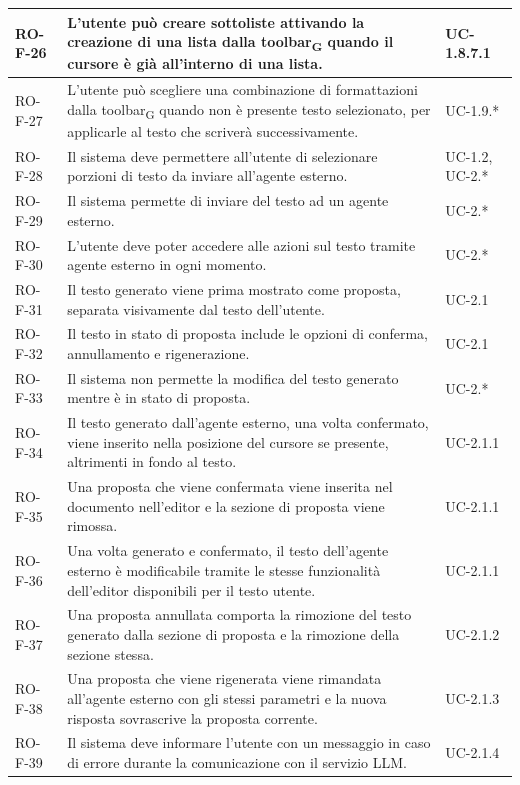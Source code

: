 \documentclass[11pt,a4paper]{article}
\newcommand{\gls}[1]{#1\textsubscript{G}}
\begin{document}
\begin{longtable}{|p{}|>{\raggedright\arraybackslash}p{}|p{}|}
\hline
RO-F-26 & L'utente può creare sottoliste attivando la creazione di una lista dalla \gls{toolbar} quando il cursore è già all'interno di una lista. & UC-1.8.7.1 \\
\hline
RO-F-27 & L'utente può scegliere una combinazione di formattazioni dalla \gls{toolbar} quando non è presente testo selezionato, per applicarle al testo che scriverà successivamente. & UC-1.9.* \\
\hline
RO-F-28 & Il sistema deve permettere all'utente di selezionare porzioni di testo da inviare all'agente esterno. & UC-1.2, UC-2.* \\
\hline
RO-F-29 & Il sistema permette di inviare del testo ad un agente esterno. & UC-2.* \\
\hline
RO-F-30 & L'utente deve poter accedere alle azioni sul testo tramite agente esterno in ogni momento. & UC-2.* \\
\hline
RO-F-31 & Il testo generato viene prima mostrato come proposta, separata visivamente dal testo dell'utente. & UC-2.1 \\
\hline
RO-F-32 & Il testo in stato di proposta include le opzioni di conferma, annullamento e rigenerazione. & UC-2.1 \\
\hline
RO-F-33 & Il sistema non permette la modifica del testo generato mentre è in stato di proposta. & UC-2.* \\
\hline
RO-F-34 & Il testo generato dall'agente esterno, una volta confermato, viene inserito nella posizione del cursore se presente, altrimenti in fondo al testo. & UC-2.1.1 \\
\hline
RO-F-35 & Una proposta che viene confermata viene inserita nel documento nell'editor e la sezione di proposta viene rimossa. & UC-2.1.1 \\
\hline
RO-F-36 & Una volta generato e confermato, il testo dell'agente esterno è modificabile tramite le stesse funzionalità dell'editor disponibili per il testo utente. & UC-2.1.1 \\
\hline
RO-F-37 & Una proposta annullata comporta la rimozione del testo generato dalla sezione di proposta e la rimozione della sezione stessa. & UC-2.1.2 \\
\hline
RO-F-38 & Una proposta che viene rigenerata viene rimandata all'agente esterno con gli stessi parametri e la nuova risposta sovrascrive la proposta corrente. & UC-2.1.3 \\
\hline
RO-F-39 & Il sistema deve informare l'utente con un messaggio in caso di errore durante la comunicazione con il servizio LLM. & UC-2.1.4 \\

\end{longtable}
\end{document}
